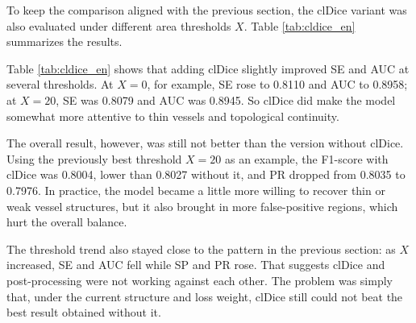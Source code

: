 \documentclass[a4paper,12pt]{article}
\begin{document}
To keep the comparison aligned with the previous section, the clDice variant was also evaluated under different area thresholds \(X\). Table \ref{tab:cldice_en} summarizes the results.

\begin{table}[htbp]
\centering
\caption{Comparison of results under different post-processing thresholds after adding clDice}
\label{tab:cldice_en}
\end{table}

Table \ref{tab:cldice_en} shows that adding clDice slightly improved SE and AUC at several thresholds. At \(X=0\), for example, SE rose to 0.8110 and AUC to 0.8958; at \(X=20\), SE was 0.8079 and AUC was 0.8945. So clDice did make the model somewhat more attentive to thin vessels and topological continuity.

The overall result, however, was still not better than the version without clDice. Using the previously best threshold \(X=20\) as an example, the F1-score with clDice was 0.8004, lower than 0.8027 without it, and PR dropped from 0.8035 to 0.7976. In practice, the model became a little more willing to recover thin or weak vessel structures, but it also brought in more false-positive regions, which hurt the overall balance.

The threshold trend also stayed close to the pattern in the previous section: as \(X\) increased, SE and AUC fell while SP and PR rose. That suggests clDice and post-processing were not working against each other. The problem was simply that, under the current structure and loss weight, clDice still could not beat the best result obtained without it.
\end{document}
